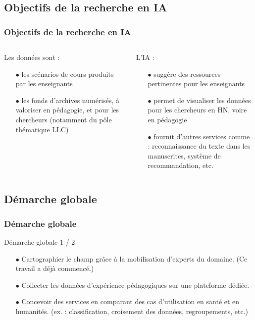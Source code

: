 \documentclass[xcolor=dvipsnames]{beamer}
\begin{document}
\subsection{Objectifs de la recherche en IA
}
\begin{frame}[fragile]
\frametitle{Objectifs de la recherche en IA
}
\begin{columns}
	\begin{block}{Les données sont :}
		\begin{itemize}
			\item[$\bullet$]les scénarios de cours produits par les enseignants
			\item[$\bullet$]les fonds d'archives numérisés, à valoriser en pédagogie, et pour les chercheurs (notamment du pôle thématique LLC)
		\end{itemize}	
	\end{block}
\vspace{4cm}
	\begin{block}{L'IA :}
		\begin{itemize}
		\item[$\bullet$]suggère des ressources pertinentes pour les enseignants
		\item[$\bullet$]permet de visualiser les données pour les chercheurs en HN, voire en pédagogie
		\item[$\bullet$]fournit d'autres services comme : reconnaissance du texte dans les manuscrites, système de recommandation, etc.
		\end{itemize}
	\end{block}
\vspace{2.5cm}
\end{columns}
\end{frame}

\subsection{Démarche globale}
\begin{frame}[fragile]
\frametitle{Démarche globale}
\begin{block}{Démarche globale 1 / 2}
	\begin{itemize}
		\item[$\bullet$]Cartographier le champ grâce à la mobilisation d'experts du domaine. (Ce travail a déjà commencé.)
		\item[$\bullet$]Collecter les données d'expérience pédagogiques sur une plateforme dédiée.
		\item[$\bullet$]Concevoir des services en comparant des cas d'utilisation en santé et en humanités. (ex. : classification, croisement des données, regroupements, etc.)
	\end{itemize}
\end{block}
\vspace{2cm}
\end{frame}
\end{document}
